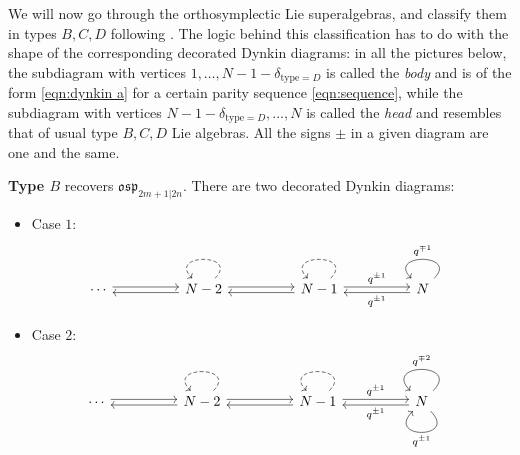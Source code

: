 \documentclass{amsart}
\def\fosp{\mathfrak{osp}}
\begin{document}
We will now go through the orthosymplectic Lie superalgebras, and classify them in types $B,C,D$ following \cite{NT}. The logic behind this classification has to do with the shape of the corresponding decorated Dynkin diagrams: in all the pictures below, the subdiagram with vertices $1,\dots,N-1-\delta_{\text{type}=D}$ is called the \emph{body} and is of the form \eqref{eqn:dynkin a} for a certain parity sequence \eqref{eqn:sequence}, while the subdiagram with vertices $N-1-\delta_{\text{type}=D},\dots,N$ is called the \emph{head} and resembles that of usual type $B,C,D$ Lie algebras. All the signs $\pm$ in a given diagram are one and the same. 

\medskip 

\noindent \textbf{Type $B$} recovers $\fosp_{2m+1|2n}$. There are two decorated Dynkin diagrams:

\medskip 

\begin{itemize}[leftmargin=*]
	
\item 

Case $1$: 
\begin{equation}
\label{eqn:dynkin b 1}
\begin{tikzcd}
\cdots && {N-2} && {N-1} && N
\arrow["q^{\pm 1}", shift left=2pt, from=1-7, to=1-5]
\arrow["q^{\pm 1}", shift left=2pt, from=1-5, to=1-7]
\arrow[shift left=2pt, from=1-5, to=1-3]
\arrow[shift left=2pt, from=1-3, to=1-5]
\arrow[shift left=2pt, from=1-3, to=1-1]
\arrow[shift left=2pt, from=1-1, to=1-3]
\arrow["q^{\mp 1}"', from=1-7, to=1-7, looseness=4]
\arrow[dashed, from=1-5, to=1-5, looseness=4]
\arrow[dashed, from=1-3, to=1-3, looseness=4]
\end{tikzcd}
\end{equation}

\medskip

\item 
Case $2$: 
\begin{equation}
\label{eqn:dynkin b 2}
\begin{tikzcd}
\cdots && {N-2} && {N-1} && N 
\arrow["q^{\pm 1}", shift left=2pt, from=1-7, to=1-5]
\arrow["q^{\pm 1}", shift left=2pt, from=1-5, to=1-7]
\arrow[shift left=2pt, from=1-5, to=1-3]
\arrow[shift left=2pt, from=1-3, to=1-5]
\arrow[shift left=2pt, from=1-3, to=1-1]
\arrow[shift left=2pt, from=1-1, to=1-3]
\arrow["q^{\mp 2}"', from=1-7, to=1-7, out=45, in=135, distance=10mm]
\arrow["q^{\pm 1}", from=1-7, to=1-7, out=315, in=225, distance=10mm]
\arrow[dashed, from=1-5, to=1-5, looseness=4]
\arrow[dashed, from=1-3, to=1-3, looseness=4]
\end{tikzcd}
\end{equation}

\end{itemize}
\end{document}
